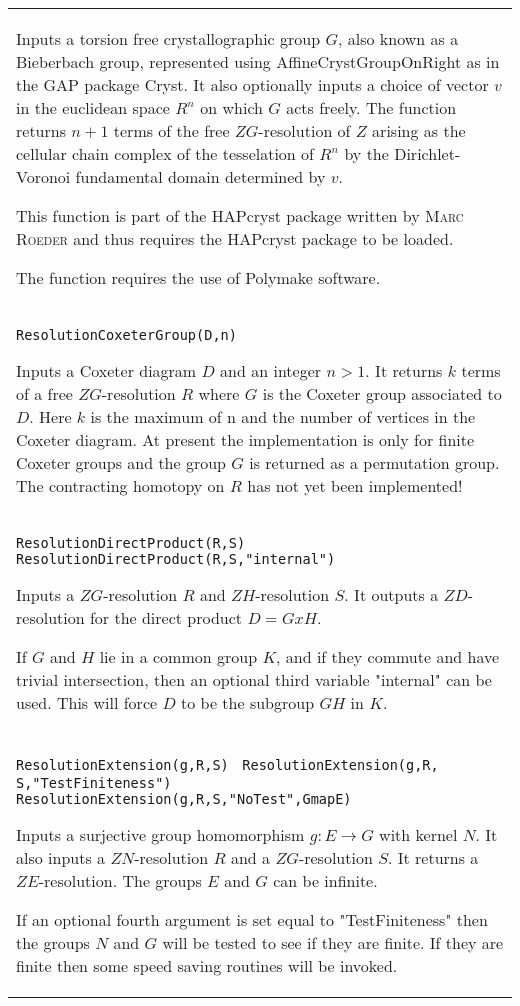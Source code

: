 \documentclass[a4paper,11pt]{report}
\begin{document}
{\begin{center}
\begin{tabular}{|l|}
 Inputs a torsion free crystallographic group $G$, also known as a Bieberbach group, represented using AffineCrystGroupOnRight
as in the GAP package Cryst. It also optionally inputs a choice of vector $v$ in the euclidean space $R^n$ on which $G$ acts freely. The function returns $n+1$ terms of the free $ZG$-resolution of $Z$ arising as the cellular chain complex of the tesselation of $R^n$ by the Dirichlet-Voronoi fundamental domain determined by $v$. 

 This function is part of the HAPcryst package written by \textsc{Marc Roeder} and thus requires the HAPcryst package to be loaded. 

 The function requires the use of Polymake software. \\
 \index{ResolutionCoxeterGroup} \texttt{ResolutionCoxeterGroup(D,n)} 

 Inputs a Coxeter diagram $D$ and an integer $n>1$. It returns $k$ terms of a free $ZG$-resolution $R$ where $G$ is the Coxeter group associated to $D$. Here $k$ is the maximum of n and the number of vertices in the Coxeter diagram. At
present the implementation is only for finite Coxeter groups and the group $G$ is returned as a permutation group. The contracting homotopy on $R$ has not yet been implemented! \\
 \index{ResolutionDirectProduct} \texttt{ResolutionDirectProduct(R,S) } \texttt{ResolutionDirectProduct(R,S,"internal")} 

 Inputs a $ZG$-resolution $R$ and $ZH$-resolution $S$. It outputs a $ZD$-resolution for the direct product $D=G x H$.

 If $G$ and $H$ lie in a common group $K$, and if they commute and have trivial intersection, then an optional third
variable "internal" can be used. This will force $D$ to be the subgroup $GH$ in $K$. \\
 \index{ResolutionExtension} \texttt{ResolutionExtension(g,R,S) } \texttt{ResolutionExtension(g,R, S,"TestFiniteness")} \texttt{ResolutionExtension(g,R,S,"NoTest",GmapE)} 

 Inputs a surjective group homomorphism $g:E \longrightarrow G$ with kernel $N$. It also inputs a $ZN$-resolution $R$ and a $ZG$-resolution $S$. It returns a $ZE$-resolution. The groups $E$ and $G$ can be infinite.

 If an optional fourth argument is set equal to "TestFiniteness" then the
groups $N$ and $G$ will be tested to see if they are finite. If they are finite then some speed
saving routines will be invoked.


\end{tabular}
\end{center}}
\end{document}
